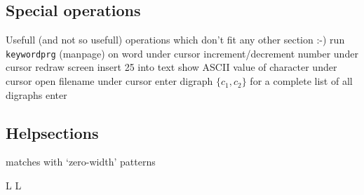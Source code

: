 \subsection{Special operations}	{Usefull (and not so usefull) operations which don't fit any other section :-)}
	{run {\tt keywordprg} (manpage) on word under cursor}
	{increment/decrement number under cursor}
	{redraw screen}
	{insert 25 into text}
	{show A{\smallrm SCII} value of character under cursor}
	{open filename under cursor}
	{enter digraph $\{c_1,c_2\}$}
	{for a complete list of all digraphs enter}

\subsection{Helpsections}	{}
	{matches with `zero-width'  patterns}


\copyrightnotice


\vfil
\supereject
\if L\lr \else\null\vfill\eject\fi
\if L\lr \else\null\vfill\eject\fi
\bye

